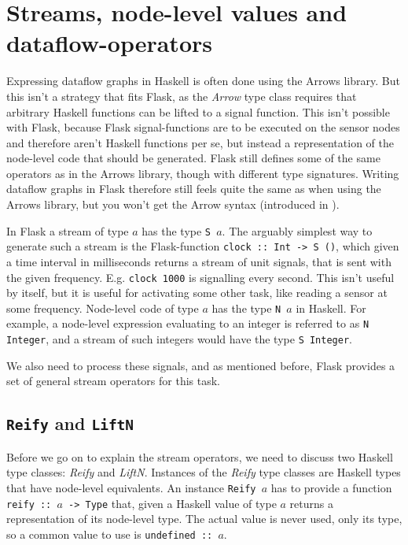 \documentclass[a4paper, oneside, final]{memoir}
\begin{document}
\section{Streams, node-level values and dataflow-operators}
Expressing dataflow graphs in Haskell is often done using the Arrows
library. But this isn't a strategy that fits Flask, as the
\textit{Arrow} type class requires that arbitrary Haskell functions
can be lifted to a signal function. This isn't possible with Flask,
because Flask signal-functions are to be executed on the sensor nodes
and therefore aren't Haskell functions per se, but instead a
representation of the node-level code that should be generated. Flask
still defines some of the same operators as in the Arrows library,
though with different type signatures. Writing dataflow graphs in
Flask therefore still feels quite the same as when using the Arrows
library, but you won't get the Arrow syntax (introduced in
\cite{PatersonRA:notation}).

In Flask a stream of type $a$ has the type \texttt{S $a$}. The
arguably simplest way to generate such a stream is the Flask-function
\texttt{clock :: Int -> S ()}, which given a time interval in
milliseconds returns a stream of unit signals, that is sent with the
given frequency. E.g. \texttt{clock 1000} is signalling every
second. This isn't useful by itself, but it is useful for activating
some other task, like reading a sensor at some frequency.  Node-level
code of type $a$ has the type \texttt{N $a$} in Haskell.  For example,
a node-level expression evaluating to an integer is referred to as
\texttt{N Integer}, and a stream of such integers would have the type
\texttt{S Integer}.

We also need to process these signals, and as mentioned before, Flask
provides a set of general stream operators for this task.


\subsection{\texttt{Reify} and \texttt{LiftN}}
Before we go on to explain the stream operators, we need to discuss
two Haskell type classes: \textit{Reify} and \textit{LiftN}.
Instances of the \textit{Reify} type classes are Haskell types that
have node-level equivalents. An instance \texttt{Reify $a$} has to
provide a function \texttt{reify :: $a$ -> Type} that, given a Haskell
value of type $a$ returns a representation of its node-level type.
The actual value is never used, only its type, so a common value to
use is \texttt{undefined :: $a$}. \hfill
\end{document}
